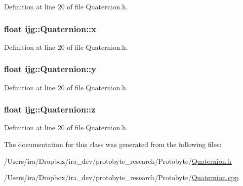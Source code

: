Definition at line 20 of file Quaternion.\-h.

\hypertarget{classijg_1_1_quaternion_aec41d09c899d038633fcf916ee461526}{
\subsubsection[{x}]{\setlength{\rightskip}{0pt plus 5cm}float ijg\-::\-Quaternion\-::x}}\label{classijg_1_1_quaternion_aec41d09c899d038633fcf916ee461526}


Definition at line 20 of file Quaternion.\-h.

\hypertarget{classijg_1_1_quaternion_af193eeb8684b68a7ded57fd713d9c7e2}{
\subsubsection[{y}]{\setlength{\rightskip}{0pt plus 5cm}float ijg\-::\-Quaternion\-::y}}\label{classijg_1_1_quaternion_af193eeb8684b68a7ded57fd713d9c7e2}


Definition at line 20 of file Quaternion.\-h.

\hypertarget{classijg_1_1_quaternion_a505ee92b39476b32c09f5178114a4b7a}{
\subsubsection[{z}]{\setlength{\rightskip}{0pt plus 5cm}float ijg\-::\-Quaternion\-::z}}\label{classijg_1_1_quaternion_a505ee92b39476b32c09f5178114a4b7a}


Definition at line 20 of file Quaternion.\-h.



The documentation for this class was generated from the following files\-:\begin{DoxyCompactItemize}
\item 
/\-Users/ira/\-Dropbox/ira\-\_\-dev/protobyte\-\_\-research/\-Protobyte/\hyperlink{_quaternion_8h}{Quaternion.\-h}\item 
/\-Users/ira/\-Dropbox/ira\-\_\-dev/protobyte\-\_\-research/\-Protobyte/\hyperlink{_quaternion_8cpp}{Quaternion.\-cpp}\end{DoxyCompactItemize}
